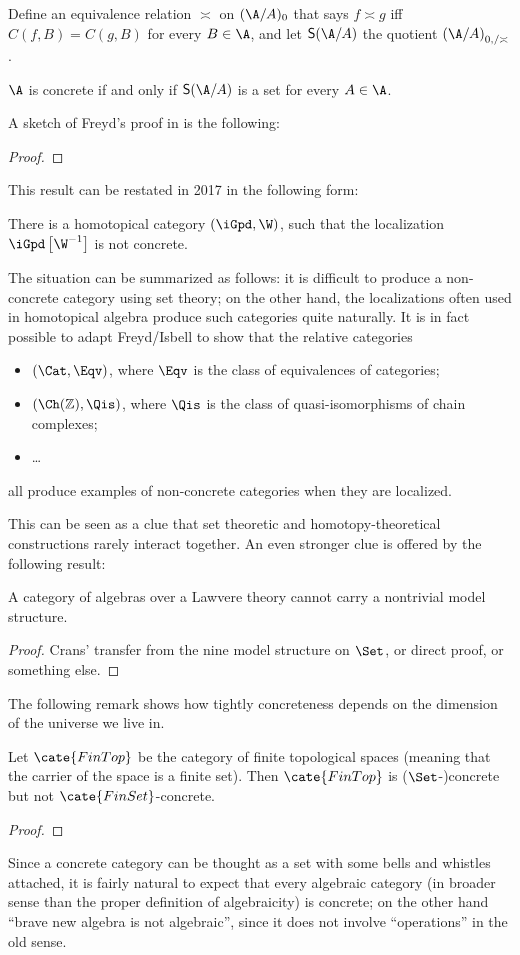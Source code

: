 \documentclass[12pt]{amsart}
\begin{document}
Define an equivalence relation $\asymp$ on $(\A/A)_0$ that says $f\asymp g$ iff $C(f,B)=C(g,B)$ for every $B\in\A$, and let $\textsf{S}(\A/A)$ the quotient $\left(\A/A\right)_{0,/\asymp}$.
\begin{lemma}
$\A$ is concrete if and only if $\textsf{S}(\A/A)$ is a set for every $A\in\A$.
\end{lemma}
A sketch of Freyd's proof in \cite[\S 2]{freyd1969concreteness} is the following:
\begin{proof}

\end{proof}
This result can be restated in 2017 in the following form:
\begin{proposition}
There is a homotopical category $(\iGpd, \W)$, such that the localization $\iGpd\left[\W^{-1}\right]$ is not concrete.
\end{proposition}
The situation can be summarized as follows: it is difficult to produce a non-concrete category using set theory; on the other hand, the localizations often used in homotopical algebra produce such categories quite naturally. It is in fact possible to adapt Freyd/Isbell to show that the relative categories
\begin{itemize}
	\item $(\Cat, \Eqv)$, where $\Eqv$ is the class of equivalences of categories;
	\item $(\Ch(\mathbb{Z}), \Qis)$, where $\Qis$ is the class of quasi-isomorphisms of chain complexes;
	\item \dots
\end{itemize}
all produce examples of non-concrete categories when they are localized.

This can be seen as a clue that set theoretic and homotopy-theoretical constructions rarely interact together. An even stronger clue is offered by the following result:
\begin{theorem}
A category of algebras over a Lawvere theory cannot carry a nontrivial model structure.
\end{theorem}
\begin{proof}
Crans' transfer from the nine model structure on $\Set$, or direct proof, or something else.
\end{proof}
The following remark shows how tightly concreteness depends on the dimension of the universe we live in.
\begin{remark} Let $\cate{FinTop}$ be the category of finite topological spaces (meaning that the carrier of the space is a finite set). Then $\cate{FinTop}$ is ($\Set$-)concrete but not $\cate{FinSet}$-concrete.
\end{remark}
\begin{proof}

\end{proof}
Since a concrete category can be thought as a set with some bells and whistles attached, it is fairly natural to expect that every algebraic category (in broader sense than the proper definition of algebraicity) is concrete; on the other hand ``brave new algebra is not algebraic'', since it does not involve ``operations'' in the old sense. 
\end{document}
